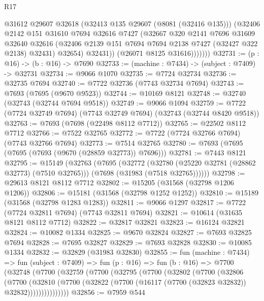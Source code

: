 \begin{lexlean}{R17}
\begin{coremodule}
                  @31612
                  @29607
                  @32618
                  (@32413 @135 @29607 (@8081 (@32416 @135)))
                  (@32406
                    @2142
                    @151
                    @31610
                    @7694
                    @32616
                    @7427
                    (@32667
                      @320
                      @2141
                      @7696
                      @31609
                      @32640
                      @32616
                      (@32406 @2139 @151 @7694 @7694 @2138 @7427 (@32427 @322 @2138) @32431)
                      @32654)
                    @32431))
                (@26071 @8125 @31616)))))))
@32731 := (p : @16) -> (b : @16) -> @7690
@32733 := (machine : @7434) -> (subject : @7409) -> @32731
@32734 := @9066 @1070
@32735 := @7724 @32734
@32736 := @32735 @7694
@32740 := @7722 @32736 (@7743 @32734 @7694)
@32743 := @7693 (@7695 (@9670 @9523))
@32744 := @10169 @8121
@32748 := @32740 (@32743 (@32744 @7694 @9518))
@32749 := @9066 @1094
@32759 := @7722 (@7724 @32749 @7694) (@7743 @32749 @7694) (@32743 (@32744 @8420 @9518))
@32763 := @7693 (@7698 (@22498 @8112 @7712))
@32765 := @22502 @8112 @7712
@32766 := @7522 @32765
@32772 := @7722 (@7724 @32766 @7694) (@7743 @32766 @7694)
@32773 := @7514 @32765
@32780 := @7693 (@7695 (@7695 (@7693 (@9670 (@28859 @32773)) @7696)))
@32781 := @7443 @8121
@32795 := @15149
    (@32763
      (@7695
        (@32772
          (@32780 (@25220 @32781 (@28862 @32773) (@7510 @32765)))
          (@7698 (@31983 (@7518 @32765))))))
@32798 := @29613 @8121 @8112 @7712
@32802 := @15205 (@31568 (@32798 @1206 @1206))
@32806 := @15181 (@31568 (@32798 @1252 @1252))
@32810 := @15189 (@31568 (@32798 @1283 @1283))
@32811 := @9066 @1297
@32817 := @7722 (@7724 @32811 @7694) (@7743 @32811 @7694)
@32821 := @10614 (@31635 @8121 @8112 @7712)
@32822 := @32817 @32821
@32823 := @16124 @32821
@32824 := @10082 @1334
@32825 := @9670 @32824
@32827 := @7693 @32825 @7694
@32828 := @7695 @32827
@32829 := @7693 @32828
@32830 := @10085 @1334
@32832 := @32829 (@31983 @32830)
@32855 := fun (machine : @7434) =>
  fun (subject : @7409) =>
  fun (p : @16) =>
  fun (b : @16) =>
  @7700
    (@32748
      (@7700
        (@32759
          (@7700
            (@32795
              (@7700
                (@32802
                  (@7700
                    (@32806
                      (@7700
                        (@32810
                          (@7700
                            (@32822 (@7700 (@16117 (@7700 (@32823 @32832)) @32832)))))))))))))))
@32856 := @7959 @544

\end{coremodule}
\end{lexlean}
